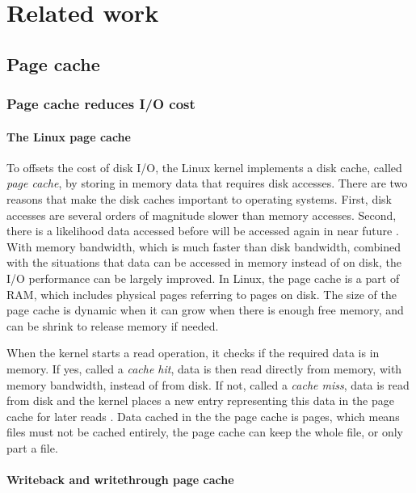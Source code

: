 \chapter{Related work}
\label{relatedwork}

\section{Page cache}

\subsection{Page cache reduces I/O cost}

\subsubsection{The Linux page cache}

To offsets the cost of disk I/O, the Linux kernel implements a disk cache, 
called \textit{page cache}, by storing in memory data that requires disk accesses. 
There are two reasons that make the disk caches important to operating systems. 
First, disk accesses are several orders of magnitude slower than memory accesses. 
Second, there is a likelihood data accessed before will be accessed again 
in near future \cite{linuxdev3rd2010}. 
With memory bandwidth, which is much faster than disk bandwidth, combined with 
the situations that data can be accessed in memory instead of on disk, the I/O 
performance can be largely improved. 
In Linux, the page cache is a part of RAM, which includes physical pages referring 
to pages on disk. 
The size of the page cache is dynamic when it can grow when there is enough 
free memory, and can be shrink to release memory if needed. 

When the kernel starts a read operation, it checks if the required data is in memory. 
If yes, called a \textit{cache hit}, data is then read directly from memory, 
with memory bandwidth, instead of from disk. 
If not, called a \textit{cache miss}, data is read from disk and the kernel 
places a new entry representing this data in the page cache for later reads 
\cite{linuxdev3rd2010}. 
Data cached in the the page cache is pages, which means files must not be 
cached entirely, the page cache can keep the whole file, or only part a file. 

\subsubsection{Writeback and writethrough page cache}

